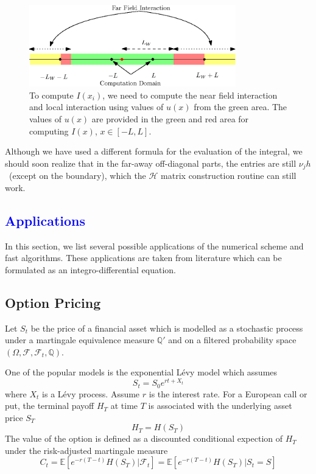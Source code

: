 \documentclass[10pt,a4paper]{article}
\newcommand{\lib}[1]{\textcolor{blue}{\section{#1}}}
\theoremstyle{definition}
\begin{document}
\begin{figure}[H] %
\centering
\includegraphics[width=0.8\textwidth,keepaspectratio]{figures/fig31}
\caption{To compute $I(x_i)$, we need to compute the near field interaction and local interaction using values of $u(x)$ from the green area. The values of $u(x)$ are provided in the green and red area for computing $I(x)$, $x\in [-L, L]$.}
\label{fig:fig31}
\end{figure}


Although we have used a different formula for the evaluation of the integral, we should soon realize that in the far-away off-diagonal parts, the entries are still $\nu_j h$~(except on the boundary), which the $\mathcal{H}$ matrix construction routine can still work. 

\lib{Applications}

In this section, we list several possible applications of the numerical scheme and fast algorithms. These applications are taken from literature which can be formulated as an integro-differential equation.

\subsection{Option Pricing}

Let $S_t$ be the price of a financial asset which is modelled as a stochastic process under a martingale equivalence measure $\mathbb{Q}'$ and on a filtered probability space $(\Omega, \mathcal{F}, \mathcal{F}_t, \mathbb{Q})$.

One of the popular models is the exponential L\'evy model which assumes
\begin{equation}
	S_t = S_0 e^{rt+X_t}
\end{equation}
where $X_t$ is a L\'evy process. Assume $r$ is the interest rate. For a European call or put, the terminal payoff $H_T$ at time $T$ is associated with the underlying asset price $S_T$
\begin{equation}
	H_T = H(S_T)
\end{equation}
 The value of the option is defined as a discounted conditional expection of $H_T$ under the risk-adjusted martingale measure
\begin{equation}
	C_t = \mathbb{E}[e^{-r(T-t)}H(S_T)|\mathcal{F}_t] = \mathbb{E}[e^{-r(T-t)}H(S_T)|S_t=S]
\end{equation}
\end{document}
